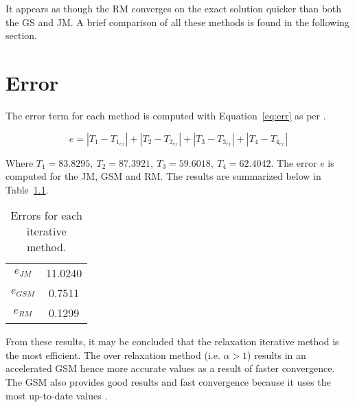 It appears as though the RM converges on the exact solution quicker than both the GS and JM. A brief comparison of all these methods is found in the following section.\\

\chapter{Error}
\label{chap:error}

The error term for each method is computed with Equation~\ref{eq:err} as per \cite{assign}.

\begin{equation}
	\label{eq:err}	
	e = |T_1 - T_{1_{ex}}|+|T_2 - T_{2_{ex}}|+|T_3 - T_{3_{ex}}|+|T_4 - T_{4_{ex}}|
\end{equation}

Where $T_1 = 83.8295,\ T_2 = 87.3921,\ T_3 = 59.6018,\ T_4 = 62.4042$. The error $e$ is computed for the JM, GSM and RM. The results are summarized below in Table~\ref{tab:err}.

\begin{table}[H]
  \centering
  \caption{Errors for each iterative method.}
    \begin{tabular}{c|c}
    \hline
    $e_{JM}$ 	& 11.0240 \\
    $e_{GSM}$ 	& 0.7511 \\
    $e_{RM}$ 	& 0.1299 \\
    \hline
    \end{tabular}
  \label{tab:err}
\end{table}

From these results, it may be concluded that the relaxation iterative method is the most efficient. The over relaxation method (i.e. $\alpha>1$) results in an accelerated GSM hence more accurate values as a result of faster convergence. The GSM also provides good results and fast convergence because it uses the most up-to-date values \cite{cfdbook}.